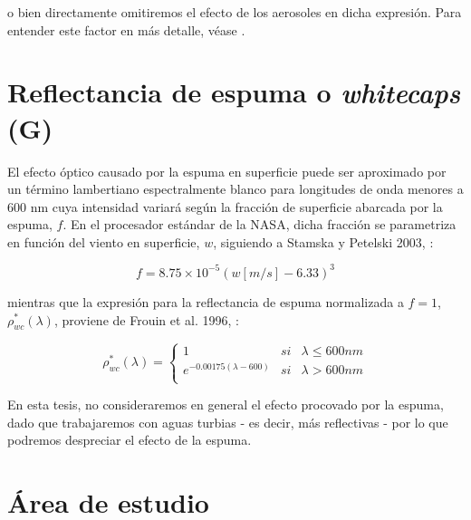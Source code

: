     \noindent o bien directamente omitiremos el efecto de los aerosoles en dicha expresión. Para entender este factor en más detalle, véase \cite{mobley2016}.

\section{Reflectancia de espuma o \textit{whitecaps} (G)}
\label{int:s:whitecaps}

    El efecto óptico causado por la espuma en superficie puede ser aproximado por un término lambertiano espectralmente blanco para longitudes de onda menores a 600 nm cuya intensidad variará según la fracción de superficie abarcada por la espuma, $f$. En el procesador estándar de la NASA, dicha fracción se parametriza en función del viento en superficie, $w$, siguiendo a Stamska y Petelski 2003, \cite{stramska2003}:
    
    \begin{equation}
        f = 8.75\times 10^{-5}(w[m/s]-6.33)^3
        \label{int:eq:rhoWC_f}
    \end{equation}

    \noindent mientras que la expresión para la reflectancia de espuma normalizada a $f=1$, $\rho^{*}_{wc}(\lambda)$, proviene de Frouin et al. 1996, \cite{frouin1996}:
    
    \begin{equation}
        \rho^{*}_{wc}(\lambda) = \left\{ \begin{array}{lcc}
                     1 &   si &  \lambda \leq 600 nm \\
                     e^{-0.00175(\lambda-600)} &  si & \lambda > 600 nm\\
                     \end{array}
           \right.
        \label{int:eq:rhoWC_a}
    \end{equation}
    
    En esta tesis, no consideraremos en general el efecto procovado por la espuma, dado que trabajaremos con aguas turbias - es decir, más reflectivas - por lo que podremos despreciar el efecto de la espuma.
\section{Área de estudio}
\label{int:s:area}


